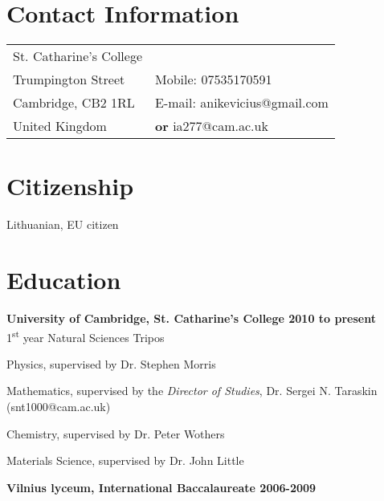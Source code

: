 




\section{Contact Information}
%
%
%
\newlength{\rcollength}\setlength{\rcollength}{1.95in}%
%
\begin{tabular}[t]{@{}p{\textwidth-\rcollength-.3in}p{\rcollength}}
  St. Catharine's College       & \\
  Trumpington Street            & \hfill Mobile: 07535170591 \\
  Cambridge, CB2 1RL            & \hfill E-mail: anikevicius@gmail.com \\
  United Kingdom                & \hfill {\bf or} ia277@cam.ac.uk \\
\end{tabular}

\section{Citizenship}
Lithuanian, EU citizen

\section{Education}
\textbf{University of Cambridge, St. Catharine's College
\hfill 2010 to present}\\
1\textsuperscript{st} year Natural Sciences Tripos

\begin{innerlist}
  \item Physics, supervised by Dr. Stephen Morris
  \item Mathematics, supervised by the {\em Director of Studies}, Dr. Sergei N.
          Taraskin (snt1000@cam.ac.uk)
  \item Chemistry, supervised by Dr. Peter Wothers
  \item Materials Science, supervised by Dr. John Little
\end{innerlist}

\textbf{Vilnius lyceum, International Baccalaureate
\hfill 2006-2009}

